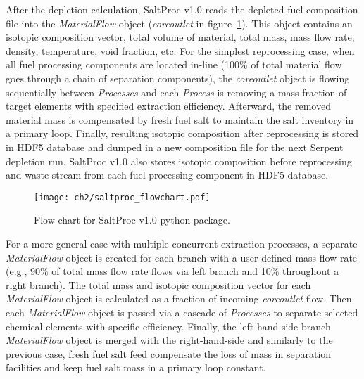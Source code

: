 After the depletion calculation, SaltProc v1.0 reads the depleted fuel 
composition file into the \textit{MaterialFlow} object 
(\textit{core\textunderscore outlet} in figure~\ref{fig:saltproc_flow}). This 
object contains an isotopic composition vector, total volume of material, 
total mass, mass flow rate, density, temperature, void fraction, etc. For the 
simplest reprocessing case, when all fuel processing components are located 
in-line (100\% of total material flow goes through a chain of separation 
components), the \textit{core\textunderscore outlet} object is flowing 
sequentially between \textit{Processes} and each \textit{Process} is removing 
a mass fraction of target elements with specified extraction efficiency. 
Afterward, the removed material mass is compensated by fresh fuel salt to 
maintain the salt inventory in a primary loop. Finally, resulting isotopic 
composition after reprocessing is stored in HDF5 database and dumped in a new 
composition file for the next Serpent depletion run. SaltProc v1.0 also 
stores 
isotopic composition before reprocessing and waste stream from each fuel 
processing component in HDF5 database. 
\begin{figure}[ht!] %
	\centering
	\texttt{[image: ch2/saltproc\_flowchart.pdf]}
	\vspace{-0.15in}
	\caption{Flow chart for SaltProc v1.0 python package.}
	\label{fig:saltproc_flow}
\end{figure}

For a more general case with multiple concurrent extraction processes, a 
separate \textit{MaterialFlow} object is created for each branch with a 
user-defined mass flow rate (e.g., 90\% of total mass flow rate flows via left 
branch and 10\% throughout a right branch). The total mass and isotopic 
composition vector for each \textit{MaterialFlow} object is calculated as a 
fraction of incoming \textit{core\textunderscore outlet} flow. Then each 
\textit{MaterialFlow} object is passed via a cascade of \textit{Processes} to 
separate selected chemical elements with specific efficiency. Finally, the 
left-hand-side branch \textit{MaterialFlow} object is merged with the 
right-hand-side and similarly to the previous case, fresh fuel salt feed 
compensate the loss of mass in separation facilities and keep fuel salt mass 
in a primary loop constant.

